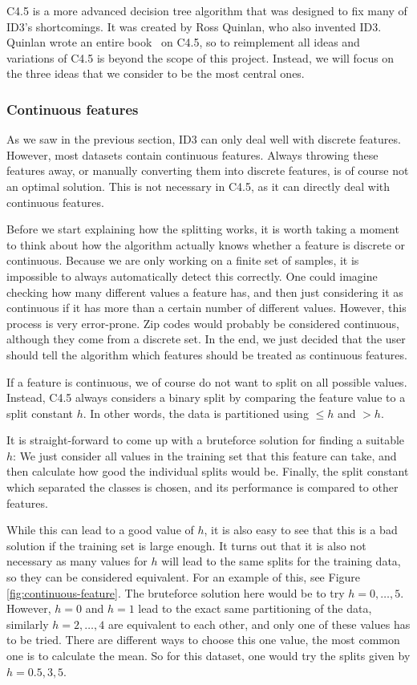 \documentclass[a4paper]{article}
\begin{document}
C4.5 is a more advanced decision tree algorithm that was designed to fix many of ID3's shortcomings. It was created by Ross Quinlan, who also invented ID3. Quinlan wrote an entire book~\cite{quinlan2014c4} on C4.5, so to reimplement all ideas and variations of C4.5 is beyond the scope of this project. Instead, we will focus on the three ideas that we consider to be the most central ones.

\subsubsection{Continuous features}

As we saw in the previous section, ID3 can only deal well with discrete features. However, most datasets contain continuous features. Always throwing these features away, or manually converting them into discrete features, is of course not an optimal solution. This is not necessary in C4.5, as it can directly deal with continuous features.

Before we start explaining how the splitting works, it is worth taking a moment to think about how the algorithm actually knows whether a feature is discrete or continuous. Because we are only working on a finite set of samples, it is impossible to always automatically detect this correctly. One could imagine checking how many different values a feature has, and then just considering it as continuous if it has more than a certain number of different values. However, this process is very error-prone. Zip codes would probably be considered continuous, although they come from a discrete set. In the end, we just decided that the user should tell the algorithm which features should be treated as continuous features.

If a feature is continuous, we of course do not want to split on all possible values. Instead, C4.5 always considers a binary split by comparing the feature value to a split constant $h$. In other words, the data is partitioned using $\le h$ and $> h$.

It is straight-forward to come up with a bruteforce solution for finding a suitable $h$: We just consider all values in the training set that this feature can take, and then calculate how good the individual splits would be. Finally, the split constant which separated the classes is chosen, and its performance is compared to other features.

While this can lead to a good value of $h$, it is also easy to see that this is a bad solution if the training set is large enough. It turns out that it is also not necessary as many values for $h$ will lead to the same splits for the training data, so they can be considered equivalent. For an example of this, see Figure \ref{fig:continuous-feature}. The bruteforce solution here would be to try $h = 0, \dots, 5$. However, $h = 0$ and $h = 1$ lead to the exact same partitioning of the data, similarly $h = 2, \dots, 4$ are equivalent to each other, and only one of these values has to be tried. There are different ways to choose this one value, the most common one is to calculate the mean. So for this dataset, one would try the splits given by $h = 0.5, 3, 5$.
\end{document}
